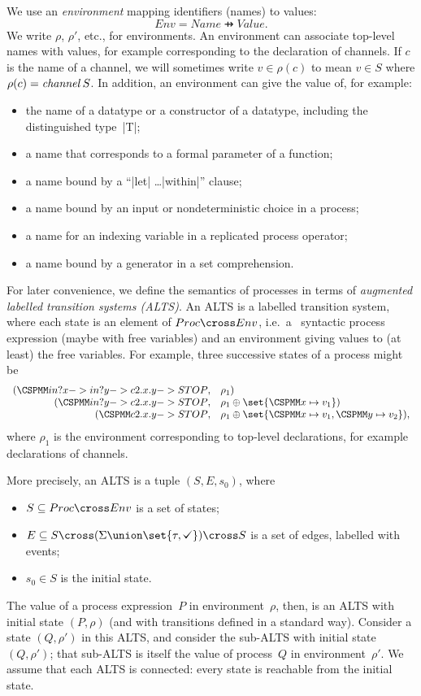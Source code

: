 

We use an \emph{environment} mapping identifiers (names) to values:
\[
Env = Name \pfun Value.
\]
We write $\rho$, $\rho'$, etc., for environments.  An environment can
associate top-level names with values, for example corresponding to the
declaration of channels.  If $c$ is the name of a channel, we will sometimes
write $v \in \rho(c)$ to mean $v \in S$ where $\rho(c) = \mathop{\it channel} S$.
In addition, an environment can give the value of, for example:
%
\begin{itemize}
\item the name of a datatype or a constructor of a datatype, including the
  distinguished type~|T|;
\item a name that corresponds to a formal parameter of a function;
\item a name bound by a ``|let| \ldots |within|'' clause;
\item a name bound by an input or nondeterministic choice in a process;
\item a name for an indexing variable in a replicated process operator;
\item a name bound by a generator in a set comprehension.
\end{itemize}

For later convenience, we define the semantics of processes in terms of
\emph{augmented labelled transition systems (ALTS)}.  An ALTS is a labelled
transition system, where each state is an element of $Proc \cross Env$, i.e.~a
\CSPm\ syntactic process expression (maybe with free variables) and an
environment giving values to (at least) the free variables.  For example,
three successive states of a process might be
\[
\begin{array}{rl}
(\M{in?x -> in?y -> c2.x.y -> STOP}, & \rho_1) \\
(\M{in?y -> c2.x.y -> STOP}, & \rho_1 \oplus \set{\M{x} \mapsto v_1}) \\
(\M{c2.x.y -> STOP}, & \rho_1 \oplus \set{\M x \mapsto v_1, \M y \mapsto v_2}),
\end{array}
\]
where $\rho_1$ is the environment corresponding to top-level declarations, for
example declarations of channels.  

More precisely, an ALTS is a tuple $(S,E,s_0)$, where
%
\begin{itemize}
\item $S \subseteq Proc \cross Env$ is a set of states;

\item $E \subseteq S \cross (\Sigma \union \set{\tau, \tick}) \cross S$ is a
  set of edges, labelled with events;

\item $s_0 \in S$ is the initial state.
\end{itemize}
%
The value of a process expression~$P$ in environment~$\rho$, then, is an ALTS
with initial state $(P,\rho)$ (and with transitions defined in a standard
way).  Consider a state $(Q,\rho')$ in this ALTS, and consider the sub-ALTS
with initial state $(Q,\rho')$; that sub-ALTS is itself the value of
process~$Q$ in environment~$\rho'$.  We assume that each ALTS is connected:
every state is reachable from the initial state. 


